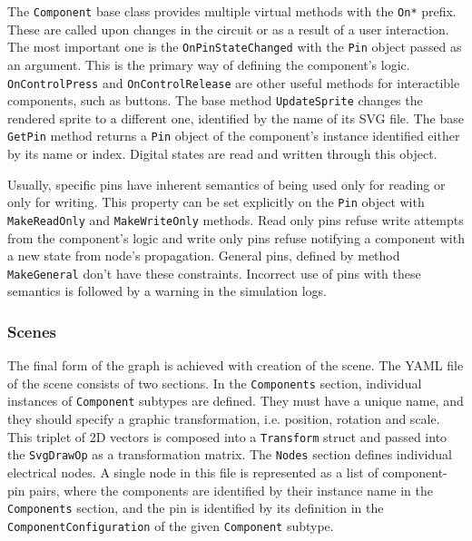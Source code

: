 The \texttt{Component} base class provides multiple virtual methods with the \texttt{On*} prefix. These are called upon changes in the circuit or as a result of a user interaction. The most important one is the \texttt{OnPinStateChanged} with the \texttt{Pin} object passed as an argument. This is the primary way of defining the component's logic. \texttt{OnControlPress} and \texttt{OnControlRelease} are other useful methods for interactible components, such as buttons. The base method \texttt{UpdateSprite} changes the rendered sprite to a different one, identified by the name of its SVG file. The base \texttt{GetPin} method returns a \texttt{Pin} object of the component's instance identified either by its name or index. Digital states are read and written through this object. 

Usually, specific pins have inherent semantics of being used only for reading or only for writing. This property can be set explicitly on the \texttt{Pin} object with \texttt{MakeReadOnly} and \texttt{MakeWriteOnly} methods. Read only pins refuse write attempts from the component's logic and write only pins refuse notifying a component with a new state from node's propagation. General pins, defined by method \texttt{MakeGeneral} don't have these constraints. Incorrect use of pins with these semantics is followed by a warning in the simulation logs.



\subsubsection{Scenes}

The final form of the graph is achieved with creation of the scene. The YAML file of the scene consists of two sections. In the \texttt{Components} section, individual instances of \texttt{Component} subtypes are defined. They must have a unique name, and they should specify a graphic transformation, i.e. position, rotation and scale. This triplet of 2D vectors is composed into a \texttt{Transform} struct and passed into the \texttt{SvgDrawOp} as a transformation matrix. The \texttt{Nodes} section defines individual electrical nodes. A single node in this file is represented as a list of component-pin pairs, where the components are identified by their instance name in the \texttt{Components} section, and the pin is identified by its definition in the \texttt{ComponentConfiguration} of the given \texttt{Component} subtype.

